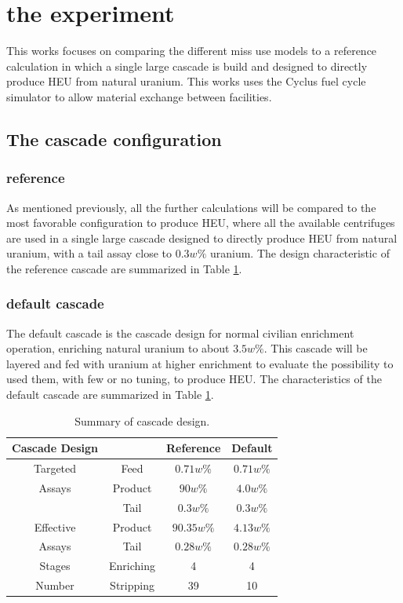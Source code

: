 \section{the experiment}
This works focuses on comparing the different miss use models to a reference
calculation in which a single large cascade is build and designed to directly
produce \gls{HEU} from natural uranium.
This works uses the Cyclus fuel cycle simulator to allow material exchange
between facilities.

\subsection{The cascade configuration}
\subsubsection{reference}
As mentioned previously, all the further calculations will be compared to the
most favorable configuration to produce \gls{HEU}, where all the available
centrifuges are used in a single large cascade designed to directly produce \gls{HEU}
from natural uranium, with a tail assay close to $0.3w\%$ uranium. The design
characteristic of the reference cascade are summarized in Table
\ref{tab:cascade_config}.

\subsubsection{default cascade}
The default cascade is the cascade design for normal civilian enrichment
operation, enriching natural uranium to about $3.5w\%$. This cascade will be
layered and fed with uranium at higher enrichment to evaluate the possibility
to used them, with few or no tuning, to produce \gls{HEU}. The characteristics of
the default cascade are summarized in Table \ref{tab:cascade_config}.

\begin{table}[htb]
\centering
  \caption{Summary of cascade design.}
\begin{tabular}{cccc}
\toprule

Cascade Design &       & Reference  & Default    \\
\midrule
Targeted  & Feed       & $0.71w\%$  & $0.71w\%$  \\
Assays    & Product    & $90w\%$    & $4.0w\%$   \\
          & Tail       & $0.3w\%$   & $0.3w\%$   \\
\midrule
Effective & Product    & $90.35w\%$ & $4.13w\%$  \\
Assays    & Tail       & $0.28w\%$  & $0.28w\%$  \\ 
\midrule
Stages    & Enriching  & 4          & 4          \\
Number    & Stripping  & 39         & 10         \\
\bottomrule
\end{tabular}
  \label{tab:cascade_config}
\end{table}



